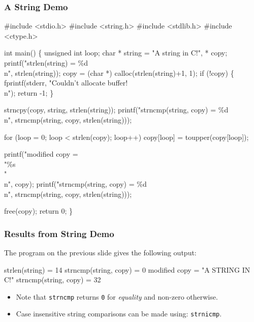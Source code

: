 \documentclass[table]{beamer}
\newif\ifschigh\schighfalse
\newcommand{\kw}[1]{\ifschigh\textcolor{red}{#1}\else\textcolor{keyword}{#1}\fi}
\newcommand{\kt}[1]{\ifschigh\textcolor{red}{#1}\else\textcolor{ctext}{#1}\fi}
\newcounter{sckll}
\newcommand{\kr}{\setcounter{sckll}{1}}
\newcommand{\kl}{}
\begin{document}
\begin{frame}[fragile]
\frametitle{A String Demo}
\vspace{-0.2in}
\begin{semiverbatim}
\tiny
\kr\kl\kw{\#include} \kt{<stdio.h>}
\kl\kw{\#include} \kt{<string.h>}
\kl\kw{\#include} \kt{<stdlib.h>}
\kl\kw{\#include} \kt{<ctype.h>}
\kl
\kl\kw{int} main()
\kl\{
\kl   \kw{unsigned int} loop;
\kl   \kw{char} * string = \kt{"A string in C!"}, * copy;
\kl   printf(\kt{"strlen(string) = \%d\\n"}, strlen(string));
\kl   copy = (char *) calloc(strlen(string)+1, 1);
\kl   \kw{if} (!copy)
\kl   \{
\kl      fprintf(stderr, \kt{"Couldn't allocate buffer!\\n"});
\kl      \kw{return} -1;
\kl   \}
\kl   
\kl   strncpy(copy, string, strlen(string));
\kl   printf(\kt{"strncmp(string, copy) = \%d\\n"},
\kl         strncmp(string, copy, strlen(string)));
\kl         
\kl   \kw{for} (loop = 0; loop < strlen(copy); loop++)
\kl      copy[loop] = toupper(copy[loop]);
\kl      
\kl   printf(\kt{"modified copy = \\"\%s\\"\\n"}, copy);
\kl   printf(\kt{"strncmp(string, copy) = \%d\\n"},
\kl         strncmp(string, copy, strlen(string)));
\kl         
\kl   free(copy);
\kl   \kw{return} 0;
\kl\}
\end{semiverbatim}
\end{frame}

\begin{frame}[fragile]
\frametitle{Results from String Demo}
The program on the previous slide gives the following output:
\begin{semiverbatim}
strlen(string) = 14
strncmp(string, copy) = 0
modified copy = "A STRING IN C!"
strncmp(string, copy) = 32
\end{semiverbatim}
\begin{itemize}
\item Note that {\tt strncmp} returns {\tt 0} for \emph{equality} and non-zero otherwise.
\item Case insensitive string comparisons can be made using: {\tt strnicmp}.
\end{itemize}
\end{frame}
\end{document}
